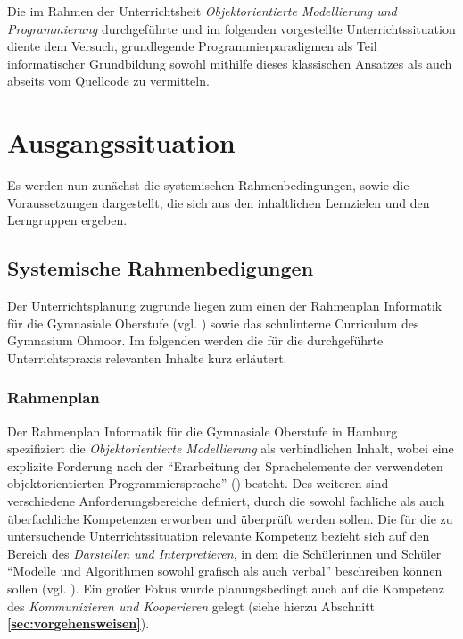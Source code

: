 \documentclass[paper=a4, DIV=13, BCOR=12mm, twoside=on, onecolumn=on, open = any, titlepage =on, parskip =half-, headsepline = on, footsepline = on, chapterprefix = on, sectionprefix = on, appendixprefix = off, fontsize = 12pt, numbers = noenddot, abstract = off]{scrreprt}
\begin{document}
Die im Rahmen der Unterrichtsheit \emph{Objektorientierte Modellierung und Programmierung} durchgeführte und im folgenden vorgestellte Unterrichtssituation diente dem Versuch, grundlegende Programmierparadigmen als Teil informatischer Grundbildung sowohl mithilfe dieses klassischen Ansatzes als auch abseits vom Quellcode zu vermitteln.


\newpage
\par\singlespacing
\chapter{Ausgangssituation}
\onehalfspacing
\vspace*{-1cm}
Es werden nun zunächst die systemischen Rahmenbedingungen, sowie die Voraussetzungen dargestellt, die sich aus den inhaltlichen Lernzielen und den Lerngruppen ergeben.
\par\singlespacing
\section{Systemische Rahmenbedigungen}
\onehalfspacing
Der Unterrichtsplanung zugrunde liegen zum einen der Rahmenplan Informatik für die Gymnasiale Oberstufe (vgl. \cite{oberstufe:09}) sowie das schulinterne Curriculum des Gymnasium Ohmoor. Im folgenden werden die für die durchgeführte Unterrichtspraxis relevanten Inhalte kurz erläutert.
\par\singlespacing
\subsection{Rahmenplan}
\onehalfspacing
Der Rahmenplan Informatik für die Gymnasiale Oberstufe in Hamburg spezifiziert die \textit{Objektorientierte Modellierung} als verbindlichen Inhalt, wobei eine explizite Forderung nach der "`Erarbeitung der Sprachelemente der verwendeten objektorientierten Programmiersprache"' (\cite[S.17]{oberstufe:09}) besteht. Des weiteren sind verschiedene Anforderungsbereiche definiert, durch die sowohl fachliche als auch überfachliche Kompetenzen erworben und überprüft werden sollen. Die für die zu untersuchende Unterrichtssituation relevante Kompetenz bezieht sich auf den Bereich des \textit{Darstellen und Interpretieren}, in dem die Schülerinnen und Schüler "`Modelle und Algorithmen sowohl grafisch als auch verbal"' beschreiben können sollen (vgl. \cite[S.16]{oberstufe:09}). Ein großer Fokus wurde planungsbedingt auch auf die Kompetenz des \textit{Kommunizieren und Kooperieren} gelegt (siehe hierzu Abschnitt \textbf{\ref{sec:vorgehensweisen}}).
\end{document}
